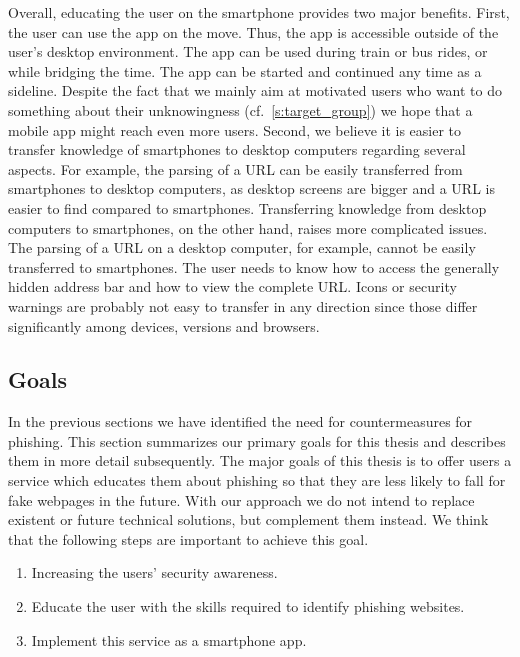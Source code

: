 Overall, educating the user on the smartphone provides two major benefits.
 First, the user can use the app on the move.
 Thus, the app is accessible outside of the user's desktop environment.
 The app can be used during train or bus rides, or while bridging the time.
 The app can be started and continued any time as a sideline.
Despite the fact that we mainly aim at motivated users who want to do something about their unknowingness (cf.~\autoref{s:target_group}) we hope that a mobile app might reach even more users.
 Second, we believe it is easier to transfer knowledge of smartphones to desktop computers regarding several aspects.
For example, the parsing of a URL can be easily transferred from smartphones to desktop computers, as desktop screens are bigger and a URL is easier to find compared to smartphones.
 Transferring knowledge from desktop computers to smartphones, on the other hand, raises more complicated issues.
The parsing of a URL on a desktop computer, for example, cannot be easily transferred to smartphones.
The user needs to know how to access the generally hidden address bar and how to view the complete URL.
Icons or security warnings are probably not easy to transfer in any direction since those differ significantly among devices, versions and browsers.

 
\subsection{Goals}
\label{s:goals}
In the previous sections we have identified the need for countermeasures for phishing.
This section summarizes our primary goals for this thesis and describes them in more detail subsequently.
The major goals of this thesis is to offer users a service which educates them about phishing so that they are less likely to fall for fake webpages in the future.
With our approach we do not intend to replace existent or future technical solutions, but complement them instead.
 We think that the following steps are important to achieve this goal.

\begin{enumerate}
	\item Increasing the users' security awareness.
	\item Educate the user with the skills required to identify phishing websites.
	\item Implement this service as a smartphone app.
\end{enumerate}

